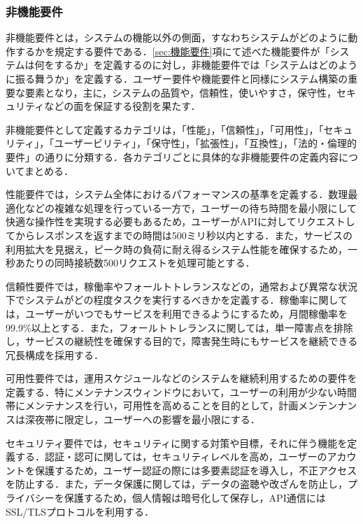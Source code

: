       \subsubsection{非機能要件}
        \label{sec:非機能要件}
          \par 非機能要件とは，システムの機能以外の側面，すなわちシステムがどのように動作するかを規定する要件である\cite{glinz2007non}．\ref{sec:機能要件}項にて述べた機能要件が「システムは何をするか」を定義するのに対し，非機能要件では「システムはどのように振る舞うか」を定義する．ユーザー要件や機能要件と同様にシステム構築の重要な要素となり，主に，システムの品質や，信頼性，使いやすさ，保守性，セキュリティなどの面を保証する役割を果たす．
          \par 非機能要件として定義するカテゴリは，「性能」，「信頼性」，「可用性」，「セキュリティ」，「ユーザービリティ」，「保守性」，「拡張性」，「互換性」，「法的・倫理的要件」の通りに分類する．各カテゴリごとに具体的な非機能要件の定義内容についてまとめる．
          \par 性能要件では，システム全体におけるパフォーマンスの基準を定義する．数理最適化などの複雑な処理を行っている一方で，ユーザーの待ち時間を最小限にして快適な操作性を実現する必要もあるため，ユーザーがAPIに対してリクエストしてからレスポンスを返すまでの時間は500ミリ秒以内とする．また，サービスの利用拡大を見据え，ピーク時の負荷に耐え得るシステム性能を確保するため，一秒あたりの同時接続数500リクエストを処理可能とする．
          \par 信頼性要件では，稼働率やフォールトトレランスなどの，通常および異常な状況下でシステムがどの程度タスクを実行するべきかを定義する．稼働率に関しては，ユーザーがいつでもサービスを利用できるようにするため，月間稼働率を99.9\%以上とする．また，フォールトトレランスに関しては，単一障害点を排除し，サービスの継続性を確保する目的で，障害発生時にもサービスを継続できる冗長構成を採用する．
          \par 可用性要件では，運用スケジュールなどのシステムを継続利用するための要件を定義する．特にメンテナンスウィンドウにおいて，ユーザーの利用が少ない時間帯にメンテナンスを行い，可用性を高めることを目的として，計画メンテンナンスは深夜帯に限定し，ユーザーへの影響を最小限にする．
          \par セキュリティ要件では，セキュリティに関する対策や目標，それに伴う機能を定義する．認証・認可に関しては，セキュリティレベルを高め，ユーザーのアカウントを保護するため，ユーザー認証の際には多要素認証を導入し，不正アクセスを防止する．また，データ保護に関しては，データの盗聴や改ざんを防止し，プライバシーを保護するため，個人情報は暗号化して保存し，API通信にはSSL/TLSプロトコルを利用する．
